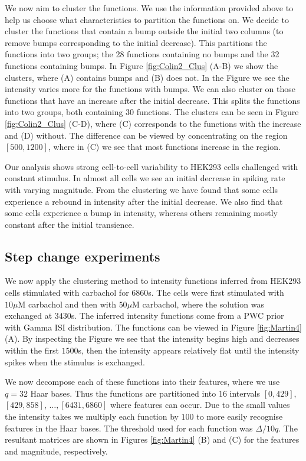 \documentclass[12pt]{book} %
\begin{document}
We now aim to cluster the functions. We use the information provided above to help us choose what characteristics to partition the functions on. We decide to cluster the functions that contain a bump outside the initial two columns (to remove bumps corresponding to the initial decrease). This partitions the functions into two groups; the 28 functions containing no bumps  and the 32 functions containing bumps. In Figure \ref{fig:Colin2_Clus} (A-B) we show the clusters, where (A) contains bumps and (B) does not. In the Figure we see the intensity varies more for the functions with bumps.     
We can also cluster on those functions that have an increase after the initial decrease. This splits the functions into two groups, both containing 30 functions. The clusters can be seen in Figure \ref{fig:Colin2_Clus} (C-D), where (C) corresponds to the functions with the increase and (D) without. The difference can be viewed by concentrating on the region $[500,1200]$, where in (C) we see that most functions increase in the region.  
 
Our analysis shows strong cell-to-cell variability to HEK293 cells challenged with constant stimulus. In almost all cells we see an initial decrease in spiking rate with varying magnitude. From the clustering we have found that some cells experience a rebound in intensity after the initial decrease. We also find that some cells experience a bump in intensity, whereas others remaining mostly constant after the initial transience. 
 
\subsection{Step change experiments}
We now apply the clustering method to intensity functions inferred from HEK293 cells stimulated with carbachol for 6860s. The cells were first stimulated with $10\mu\mathrm{M}$ carbachol and then with $50\mu\mathrm{M}$ carbachol, where the solution was exchanged at $3430$s. The inferred  intensity functions come from a PWC prior with Gamma ISI distribution. The functions can be viewed in Figure \ref{fig:Martin4} (A). By inspecting the Figure we see that the intensity begins high and decreases within the first $1500$s, then the intensity appears relatively flat until the intensity spikes when the stimulus is exchanged. 


We now decompose each of these functions into their features, where we use $q = 32$ Haar bases. Thus the functions are partitioned into 16 intervals $[0,429]$, $[429,858]$, $\dots,  [6431,6860]$ where features can occur. Due to the small values the intensity takes we multiply each function by $100$ to more easily recognise features in the Haar bases. The threshold used for each function was $\Delta/10q$. The resultant matrices are shown in Figures \ref{fig:Martin4} (B) and (C) for the features and magnitude, respectively.
\end{document}
